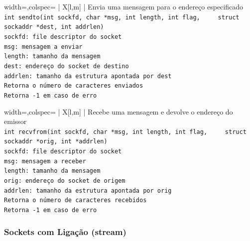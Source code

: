 \documentclass[11pt]{article}
\begin{document}
\begin{tblr}{width=\linewidth,colspec={ | X[l,m] | }}
    \hline
    \centering Envia uma mensagem para o endereço especificado  \\\hline
    \lstinline|int sendto(int sockfd, char *msg, int length, int flag,
    struct sockaddr *dest, int addrlen)|                        \\\hline
    \lstinline|sockfd: file descriptor do socket|               \\
    \lstinline|msg: mensagem a enviar|                          \\
    \lstinline|length: tamanho da mensagem|                     \\
    \lstinline|dest: endereço do socket de destino|             \\
    \lstinline|addrlen: tamanho da estrutura apontada por dest| \\\hline
    \lstinline|Retorna o número de caracteres enviados|         \\
    \lstinline|Retorna -1 em caso de erro|                      \\\hline
\end{tblr}

\begin{tblr}{width=\linewidth,colspec={ | X[l,m] | }}
    \hline
    \centering Recebe uma mensagem e devolve o endereço do emissor \\\hline
    \lstinline|int recvfrom(int sockfd, char *msg, int length, int flag,
    struct sockaddr *orig, int *addrlen)|                          \\\hline
    \lstinline|sockfd: file descriptor do socket|                  \\
    \lstinline|msg: mensagem a receber|                            \\
    \lstinline|length: tamanho da mensagem|                        \\
    \lstinline|orig: endereço do socket de origem|                 \\
    \lstinline|addrlen: tamanho da estrutura apontada por orig|    \\\hline
    \lstinline|Retorna o número de caracteres recebidos|           \\
    \lstinline|Retorna -1 em caso de erro|                         \\\hline
\end{tblr}

\subsubsection*{Sockets com Ligação (stream)}
\end{document}
